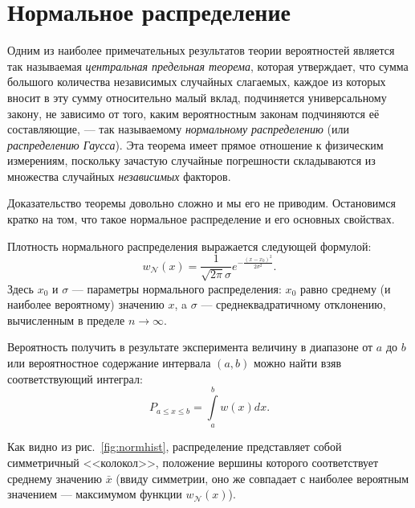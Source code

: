 
\section{Нормальное распределение}

Одним из наиболее примечательных результатов теории вероятностей является
так называемая \emph{центральная предельная теорема}, которая утверждает,
что сумма большого количества независимых случайных слагаемых, каждое
из которых вносит в эту сумму относительно малый вклад, подчиняется
универсальному закону, не зависимо от того, каким вероятностным законам
подчиняются её составляющие, --- так называемому \emph{нормальному
распределению} (или \emph{распределению Гаусса}). Эта теорема имеет
прямое отношение к физическим измерениям, поскольку зачастую случайные
погрешности складываются из множества случайных \emph{независимых}
факторов.

Доказательство теоремы довольно сложно и мы его не приводим. Остановимся
кратко на том, что такое нормальное распределение и его основных свойствах.

Плотность нормального распределения выражается следующей формулой:
\begin{equation}
    \label{eq:normal}
    \boxed{
        w_{\mathcal{N}}\!\left(x\right)=\frac{1}{\sqrt{2\pi}\sigma}e^{-\tfrac{(x-x_{0})^{2}}{2\sigma^{2}}}
    }.
\end{equation}
Здесь $x_{0}$ и $\sigma$
--- параметры нормального распределения: $x_{0}$ равно
среднему (и наиболее вероятному) значению $x$, a $\sigma$ ---
среднеквадратичному отклонению, вычисленным в пределе $n\to\infty$. 

Вероятность получить в результате эксперимента величину в диапазоне от $a$ до $b$ или вероятностное содержание интервала $(a,b)$ можно найти взяв соответствующий интеграл:
\begin{equation}
    P_{a\le x\le b}=\int\limits _{a}^{b}w\!\left(x\right)dx.\label{eq:P}
\end{equation}

Как видно из рис.~\ref{fig:normhist}, распределение представляет собой симметричный
<<колокол>>, положение вершины которого
соответствует среднему значению $\bar{x}$ (ввиду симметрии, оно же
совпадает с наиболее вероятным значением --- максимумом
функции $w_{\mathcal{N}}(x)$).

